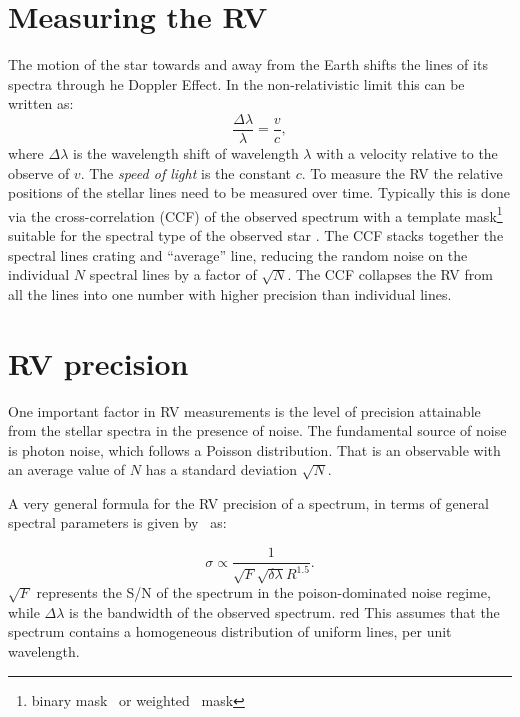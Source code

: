 
\section{Measuring the RV}
The motion of the star towards and away from the Earth shifts the lines of its spectra through he Doppler Effect. In the non-relativistic limit this can be written as:
\begin{equation}
\frac{\Delta\lambda}{\lambda} = \frac{v}{c},
\end{equation}
where $\Delta\lambda$ is the wavelength shift of wavelength $\lambda$ with a velocity relative to the observe of \(v\). The \emph{speed of light} is the constant $c$. 
To measure the RV the relative positions of the stellar lines need to be measured over time. Typically this is done via the cross-correlation (CCF) of the observed spectrum with a template mask\footnote{binary mask~\citep{baranne 1996} or weighted~\citep{pepe 2002} mask} suitable for the spectral type of the observed star \citep[e.g.][]{Baranne 1996, pepe 2002}. The {CCF} stacks together the spectral lines crating and ``average'' line, reducing the random noise on the individual $N$ spectral lines by a factor of $\sqrt{N}$. The {CCF} collapses the RV from all the lines into one number with higher precision than individual lines.


\section{RV precision}
\label{section:rv_precision}
One important factor in RV measurements is the level of precision attainable from the stellar spectra in the presence of noise. The fundamental source of noise is photon noise, which follows a Poisson distribution. That is an observable with an average value of $N$ has a standard deviation $\sqrt{N}$.

A very general formula for the RV precision of a spectrum, in terms of general spectral parameters is given by~\citet{hatzes_spectrograph_1992} as:

\begin{equation}
\sigma \propto \frac{1}{\sqrt{F} \sqrt{\delta \lambda} R^{1.5}}.
\end{equation}
$\sqrt{F}$ represents the S/N of the spectrum in the poison-dominated noise regime, while $\Delta \lambda$ is the bandwidth of the observed spectrum. {red{} This assumes that the spectrum contains a homogeneous distribution of uniform lines, per unit wavelength. }


